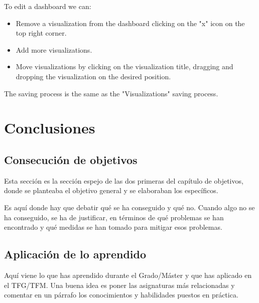 \documentclass[a4paper, 12pt, english]{book}
\begin{document}
To edit a dashboard we can:
\begin{itemize}
    \item Remove a visualization from the dashboard clicking on the "x" icon on the top right corner.
    \item Add more visualizations.
    \item Move visualizations by clicking on the visualization title, dragging and dropping the visualization on the desired position.
\end{itemize}

The saving process is the same as the "Visualizations" saving process.





\cleardoublepage
\chapter{Conclusiones}
\label{chap:conclusiones}


\section{Consecución de objetivos}
\label{sec:consecucion-objetivos}

Esta sección es la sección espejo de las dos primeras del capítulo de objetivos, donde se planteaba el objetivo general y se elaboraban los específicos.

Es aquí donde hay que debatir qué se ha conseguido y qué no.
Cuando algo no se ha conseguido, se ha de justificar, en términos de qué problemas se han encontrado y qué medidas se han tomado para mitigar esos problemas.


\section{Aplicación de lo aprendido}
\label{sec:aplicacion}

Aquí viene lo que has aprendido durante el Grado/Máster y que has aplicado en el TFG/TFM. Una buena idea es poner las asignaturas más relacionadas y comentar en un párrafo los conocimientos y habilidades puestos en práctica.
\end{document}
